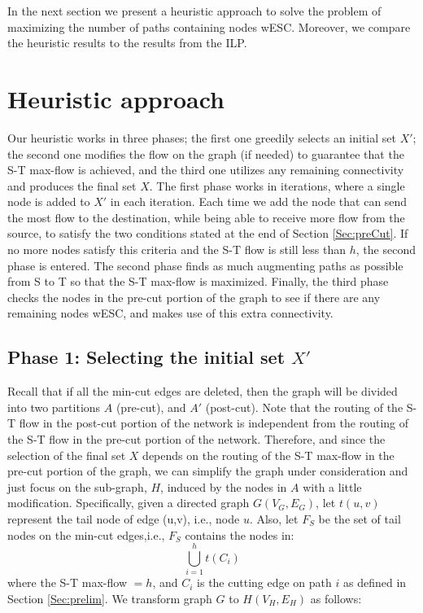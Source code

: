 \documentclass[conference]{IEEEtran}
\begin{document}
In the next section we present a heuristic approach to solve the problem of maximizing the number of paths containing nodes wESC. Moreover, we compare the heuristic results to the results from the ILP.

\section{Heuristic approach}
\label{Sec:Hrstc}

Our heuristic works in three phases; the first one greedily selects an initial set $X'$; the second one modifies the flow on the graph (if needed) to guarantee that the S-T max-flow is achieved, and the third one utilizes any remaining connectivity and produces the final set $X$. The first phase works in iterations, where a single node is added to $X'$ in each iteration. Each time we add the node that can send the most flow to the destination, while being able to receive more flow from the source, to satisfy the two conditions stated at the end of Section \ref{Sec:preCut}. If no more nodes satisfy this criteria and the S-T flow is still less than $h$, the second phase is entered. The second phase finds as much augmenting paths as possible from S to T so that the S-T max-flow is maximized. Finally, the third phase checks the nodes in the pre-cut portion of the graph to see if there are any remaining nodes wESC, and makes use of this extra connectivity.

\subsection{Phase 1: Selecting the initial set $X'$}

Recall that if all the min-cut edges are deleted, then the graph will be divided into two partitions $A$ (pre-cut), and $A'$ (post-cut). Note that the routing of the S-T flow in the post-cut portion of the network is independent from the routing of the S-T flow in the pre-cut portion of the network. Therefore, and since the selection of the final set $X$ depends on the routing of the S-T max-flow in the pre-cut portion of the graph, we can simplify the graph under consideration and just focus on the sub-graph, $H$, induced by the nodes in $A$ with a little modification. Specifically, given a directed graph $G(V_G,E_G)$, let $t(u,v)$ represent the tail node of edge (u,v), i.e., node $u$. Also, let $F_S$ be the set of tail nodes on the min-cut edges,i.e., $F_S$ contains the nodes in:\[ \bigcup_{i=1}^h t(C_i)\] where the S-T max-flow $= h$, and $C_i$ is the cutting edge on path $i$ as defined in Section \ref{Sec:prelim}. We transform graph $G$ to $H(V_H,E_H)$ as follows:
\end{document}
